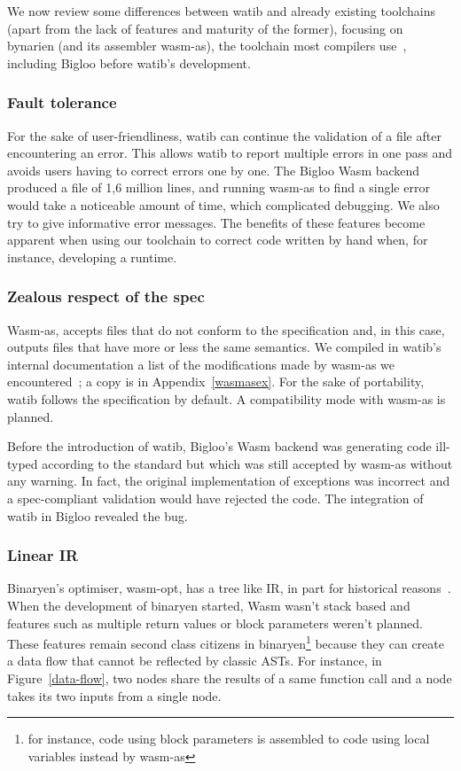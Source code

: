 \documentclass[a4paper,11pt]{article}
\begin{document}
We now review some differences between \textsf{watib} and already existing
toolchains (apart from the lack of features and maturity of the former),
focusing on bynarien (and its assembler \textsf{wasm-as}), the toolchain most
compilers use~\cite{Binaryen}, including Bigloo before \textsf{watib}'s
development.
\subsubsection{Fault tolerance}
For the sake of user-friendliness, \textsf{watib} can continue the validation of
a file after encountering an error. This allows \textsf{watib} to report
multiple errors in one pass and avoids users having to correct errors one by
one. The Bigloo Wasm backend produced a file of 1,6 million lines, and running
\textsf{wasm-as} to find a single error would take a noticeable amount of time,
which complicated debugging. We also try to give informative error messages. The
benefits of these features become apparent when using our toolchain to correct
code written by hand when, for instance, developing a runtime.

\subsubsection{{Zealous\protect\footnotemark} respect of the spec}
\textsf{Wasm-as}, accepts files that do not conform to the specification and, in
this case, outputs files that have more or less the same semantics. We compiled
in \textsf{watib}'s internal documentation a list of the modifications made by
\textsf{wasm-as} we encountered~\cite{WasmAsExtension}; a copy is in
Appendix~\ref{wasmasex}. For the sake of portability, \textsf{watib} follows the
specification by default. A compatibility mode with \textsf{wasm-as} is
planned.

Before the introduction of \textsf{watib}, Bigloo's Wasm backend was generating
code ill-typed according to the standard but which was still accepted by
\textsf{wasm-as} without any warning. In fact, the original implementation of
exceptions was incorrect and a spec-compliant validation would have rejected the
code. The integration of \textsf{watib} in Bigloo revealed the bug.

\subsubsection{Linear IR}
Binaryen's optimiser, \textsf{wasm-opt}, has a tree like IR, in part for
historical reasons~\cite{BinaryenIR}. When the development of binaryen started,
Wasm wasn't stack based and features such as multiple return values or block
parameters weren't planned. These features remain second class citizens in
binaryen\footnote{for instance, code using block parameters is assembled to code
using local variables instead by \textsf{wasm-as}} because they can create a
data flow that cannot be reflected by classic ASTs. For instance, in
Figure~\ref{data-flow}, two nodes share the results of a same function call and
a node takes its two inputs from a single node.
\end{document}
